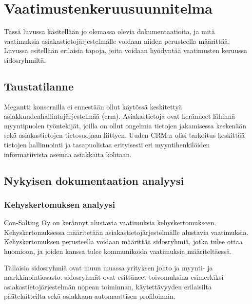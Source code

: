 \chapter{Vaatimustenkeruusuunnitelma} %
\label{keruu} %
\thispagestyle{fancy} %

Tässä luvussa käsitellään jo olemassa olevia dokumentaatioita, ja mitä vaatimuksia asiakastietojärjestelmälle voidaan niiden perusteella määrittää. Luvussa esitellään erilaisia tapoja, joita voidaan hyödyntää vaatimusten keruussa sidosryhmiltä.

\section{Taustatilanne}

Megantti konsernilla ei ennestään ollut käytössä keskitettyä asiakkuudenhallintajärjestelmää (\acrshort{crm}).
Asiakastietoja ovat keränneet lähinnä myyntipuolen työntekijät, joilla on ollut ongelmia tietojen jakamisessa keskenään sekä asiakastietojen tietosuojaan liittyen. Uuden CRM:n olisi tarkoitus keskittää tietojen hallinnointi ja tasapuolistaa erityisesti eri myyntihenkilöiden informatiivista asemaa asiakkaita kohtaan.

\section{Nykyisen dokumentaation analyysi}


    \subsection{Kehyskertomuksen analyysi}
    Con-Salting Oy on kerännyt alustavia vaatimuksia kehyskertomukseen. Kehyskertomuksessa määritetään asiakastietojärjestelmälle alustavia vaatimuksia. Kehyskertomuksen perusteella voidaan määrittää sidosryhmiä, jotka tulee ottaa huomioon, ja joiden kanssa tulee kommunikoida vaatimuksia määriteltäessä.

    Tällaisia sidosryhmiä ovat muun muassa yrityksen johto ja myynti- ja markkinointiosasto.
    sidosryhmät ovat esittäneet toivomuksina esimerkiksi asiakastietojärjestelmän nopean toiminnan, käytettävyyden erilaisilta päätelaitteilta sekä asiakkaan 
    automaattisen profiloinnin. 
        
